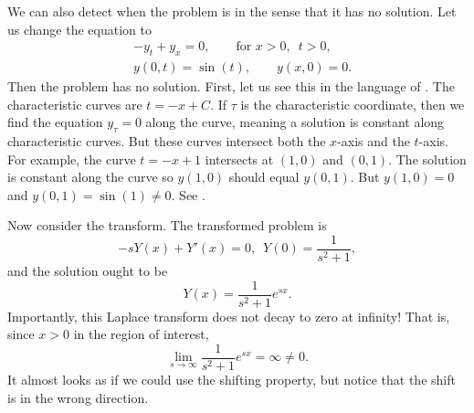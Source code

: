 We can also detect when the problem is
\emph{}
in the sense that it has no solution.
Let us change the equation to
\begin{align*}
& -y_t + y_x = 0, \qquad \text{for } x > 0, \enspace t > 0,
\\
& y(0,t) = \sin(t), \qquad y(x,0) = 0 .
\end{align*}
Then the problem
has no solution.  First, let us see this in the language of
.
The characteristic curves are $t=-x+C$.  If $\tau$ is
the characteristic coordinate, then we find the equation $y_\tau = 0$
along the curve,
meaning a solution is constant along characteristic curves.
But these curves intersect both the $x$-axis and the $t$-axis.
For example,
the curve $t=-x+1$ intersects at $(1,0)$ and $(0,1)$.  The solution is
constant along the curve so $y(1,0)$ should equal $y(0,1)$.  But
$y(1,0) = 0$ and $y(0,1) = \sin(1) \neq 0$.
See .

\begin{myfig}
\capstart
{}
\caption{Ill-posed problem.\label{lt:half-infinite-ill-posed}}
\end{myfig}

Now consider the transform.  The transformed problem is
\begin{equation*}
-sY(x) + Y'(x) = 0, \enspace Y(0) = \frac{1}{s^2+1} ,
\end{equation*}
and the solution ought to be
\begin{equation*}
Y(x) = \frac{1}{s^2+1} e^{sx} .
\end{equation*}
Importantly, this Laplace transform does not decay to zero at infinity!  That is,
since $x > 0$ in the region of interest,
\begin{equation*}
\lim_{s \to \infty}
\frac{1}{s^2+1} e^{sx}
= \infty \neq 0 .
\end{equation*}
It almost
looks as if we could use the shifting property, but notice that the shift
is in the wrong direction.

\medskip

